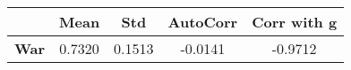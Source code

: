 \begin{tiny}\begin{tabular}{|l|c|c|c|c|}
\hline
&\textbf{Mean}&\textbf{Std}&\textbf{AutoCorr}&\textbf{Corr with g}\\\hline
\textbf{War}&0.7320&0.1513&-0.0141&-0.9712\\\hline
\end{tabular}
\end{tiny}